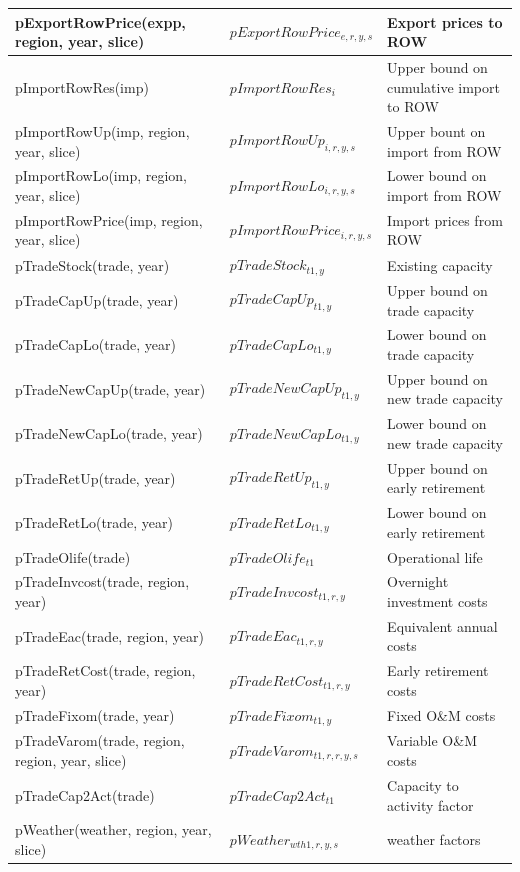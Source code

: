 \documentclass{article}
\begin{document}
\begin{longtable}{|p{10cm}|p{5cm}|p{9cm}|}
 \hline
pExportRowPrice(expp, region, year, slice) & $pExportRowPrice_{e,r,y,s}$ & Export prices to ROW \\ 
 \hline
pImportRowRes(imp) & $pImportRowRes_{i}$ & Upper bound on cumulative import to ROW \\ 
 \hline
pImportRowUp(imp, region, year, slice) & $pImportRowUp_{i,r,y,s}$ & Upper bount on import from ROW \\ 
 \hline
pImportRowLo(imp, region, year, slice) & $pImportRowLo_{i,r,y,s}$ & Lower bound on import from ROW \\ 
 \hline
pImportRowPrice(imp, region, year, slice) & $pImportRowPrice_{i,r,y,s}$ & Import prices from ROW \\ 
 \hline
pTradeStock(trade, year) & $pTradeStock_{t1,y}$ & Existing capacity \\ 
 \hline
pTradeCapUp(trade, year) & $pTradeCapUp_{t1,y}$ & Upper bound on trade capacity \\ 
 \hline
pTradeCapLo(trade, year) & $pTradeCapLo_{t1,y}$ & Lower bound on trade capacity \\ 
 \hline
pTradeNewCapUp(trade, year) & $pTradeNewCapUp_{t1,y}$ & Upper bound on new trade capacity \\ 
 \hline
pTradeNewCapLo(trade, year) & $pTradeNewCapLo_{t1,y}$ & Lower bound on new trade capacity \\ 
 \hline
pTradeRetUp(trade, year) & $pTradeRetUp_{t1,y}$ & Upper bound on early retirement \\ 
 \hline
pTradeRetLo(trade, year) & $pTradeRetLo_{t1,y}$ & Lower bound on early retirement \\ 
 \hline
pTradeOlife(trade) & $pTradeOlife_{t1}$ & Operational life \\ 
 \hline
pTradeInvcost(trade, region, year) & $pTradeInvcost_{t1,r,y}$ & Overnight investment costs \\ 
 \hline
pTradeEac(trade, region, year) & $pTradeEac_{t1,r,y}$ & Equivalent annual costs \\ 
 \hline
pTradeRetCost(trade, region, year) & $pTradeRetCost_{t1,r,y}$ & Early retirement costs \\ 
 \hline
pTradeFixom(trade, year) & $pTradeFixom_{t1,y}$ & Fixed O\&M costs \\ 
 \hline
pTradeVarom(trade, region, region, year, slice) & $pTradeVarom_{t1,r,r,y,s}$ & Variable O\&M costs \\ 
 \hline
pTradeCap2Act(trade) & $pTradeCap2Act_{t1}$ & Capacity to activity factor \\ 
 \hline
pWeather(weather, region, year, slice) & $pWeather_{wth1,r,y,s}$ & weather factors \\ 

\end{longtable}
\end{document}
